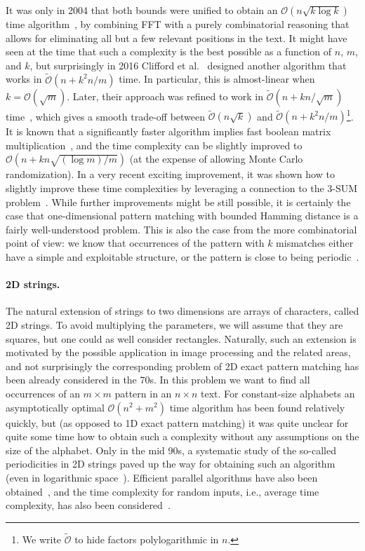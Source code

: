 \documentclass[11pt, letterpaper]{article}
\theoremstyle{plain}
\theoremstyle{definition}
\theoremstyle{remark}
\renewcommand{\O}{\mathcal{O}}
\newcommand{\tO}{\tilde{\mathcal{O}}}
\begin{document}
It was only in 2004 that both bounds were unified to obtain an $\O(n\sqrt{k \log k})$ time algorithm~\cite{Amir2004},
by combining FFT with a purely combinatorial reasoning that allows for eliminating all but a few relevant positions
in the text. It might have seen at the time that such a complexity is the best possible as a function of $n$, $m$, and $k$,
but surprisingly in 2016 Clifford et al.~\cite{Clifford2016a} designed another algorithm that works
in $\tO(n + k^2n/m)$ time. In particular, this is almost-linear when $k=\O(\sqrt{m})$. Later, their
approach was refined to work in $\tO(n + kn/\sqrt{m})$ time~\cite{Gawrychowski2018},
which gives a smooth trade-off between $\tO(n\sqrt{k})$ and $\tO(n + k^2n/m)$\footnote{We write $\tO$ to hide factors polylogarithmic in $n$.}. 
It is known that a significantly faster algorithm implies fast boolean matrix multiplication~\cite{Gawrychowski2018},
and the time complexity can be slightly improved to $\O(n + kn\sqrt{(\log m) / m})$ \cite{Chan2020} (at the expense
of allowing Monte Carlo randomization). In a very recent exciting improvement, it was shown how to slightly improve
these time complexities by leveraging a connection to the 3-SUM problem~\cite{Chan0WX23}.
While further improvements might be still possible, it is certainly the case that one-dimensional pattern matching with
bounded Hamming distance is a fairly well-understood problem.
This is also the case from the more combinatorial point of view: we know that occurrences of the pattern with $k$ mismatches
either have a simple and exploitable structure, or the pattern is close to being periodic~\cite{Bringmann2019,Charalampopoulos2020a}.

\paragraph{2D strings.} The natural extension of strings to two dimensions are arrays of characters, called 2D strings. 
To avoid multiplying the parameters, we will assume that they are squares, but one could as well consider rectangles.
Naturally, such an extension is motivated by the possible application in image processing and the related areas,
and not surprisingly the corresponding problem of 2D exact pattern matching has been already considered in the 70s.
In this problem we want to find all occurrences of an $m\times m$ pattern in an $n\times n$ text.
For constant-size alphabets an asymptotically optimal $\O(n^{2}+m^{2})$ time algorithm has been found relatively
quickly, but (as opposed to 1D exact pattern matching) it was quite unclear for quite some time how to obtain
such a complexity without any assumptions on the size of the alphabet. Only in the mid 90s, a systematic
study of the so-called periodicities in 2D strings paved up the way for obtaining such an algorithm~\cite{Amir1994,Galil1996}
(even in logarithmic space~\cite{Crochemore1995}). Efficient parallel algorithms have also been obtained~\cite{Crochemore1998,Crochemore1998},
and the time complexity for random inputs, i.e., average time complexity, has also been considered~\cite{Baeza-Yates1993,Tarhio1996,Kaerkkaeinen1999}.
\end{document}
